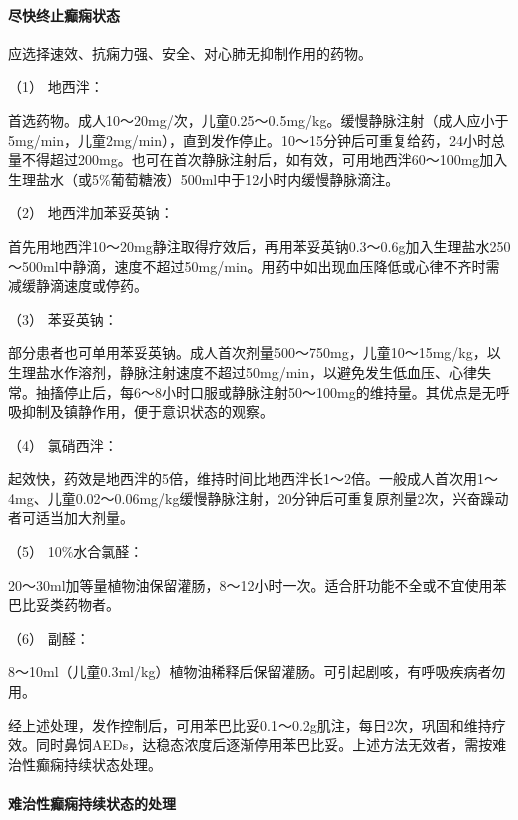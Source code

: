 \paragraph{尽快终止癫痫状态}

应选择速效、抗痫力强、安全、对心肺无抑制作用的药物。

\hypertarget{text00245.htmlux5cux23CHP8-2-3-4-2-1}{}
（1） 地西泮：

首选药物。成人10～20mg/次，儿童0.25～0.5mg/kg。缓慢静脉注射（成人应小于5mg/min，儿童2mg/min），直到发作停止。10～15分钟后可重复给药，24小时总量不得超过200mg。也可在首次静脉注射后，如有效，可用地西泮60～100mg加入生理盐水（或5\%葡萄糖液）500ml中于12小时内缓慢静脉滴注。

\hypertarget{text00245.htmlux5cux23CHP8-2-3-4-2-2}{}
（2） 地西泮加苯妥英钠：

首先用地西泮10～20mg静注取得疗效后，再用苯妥英钠0.3～0.6g加入生理盐水250～500ml中静滴，速度不超过50mg/min。用药中如出现血压降低或心律不齐时需减缓静滴速度或停药。

\hypertarget{text00245.htmlux5cux23CHP8-2-3-4-2-3}{}
（3） 苯妥英钠：

部分患者也可单用苯妥英钠。成人首次剂量500～750mg，儿童10～15mg/kg，以生理盐水作溶剂，静脉注射速度不超过50mg/min，以避免发生低血压、心律失常。抽搐停止后，每6～8小时口服或静脉注射50～100mg的维持量。其优点是无呼吸抑制及镇静作用，便于意识状态的观察。

\hypertarget{text00245.htmlux5cux23CHP8-2-3-4-2-4}{}
（4） 氯硝西泮：

起效快，药效是地西泮的5倍，维持时间比地西泮长1～2倍。一般成人首次用1～4mg、儿童0.02～0.06mg/kg缓慢静脉注射，20分钟后可重复原剂量2次，兴奋躁动者可适当加大剂量。

\hypertarget{text00245.htmlux5cux23CHP8-2-3-4-2-5}{}
（5） 10\%水合氯醛：

20～30ml加等量植物油保留灌肠，8～12小时一次。适合肝功能不全或不宜使用苯巴比妥类药物者。

\hypertarget{text00245.htmlux5cux23CHP8-2-3-4-2-6}{}
（6） 副醛：

8～10ml（儿童0.3ml/kg）植物油稀释后保留灌肠。可引起剧咳，有呼吸疾病者勿用。

经上述处理，发作控制后，可用苯巴比妥0.1～0.2g肌注，每日2次，巩固和维持疗效。同时鼻饲AEDs，达稳态浓度后逐渐停用苯巴比妥。上述方法无效者，需按难治性癫痫持续状态处理。

\paragraph{难治性癫痫持续状态的处理}

